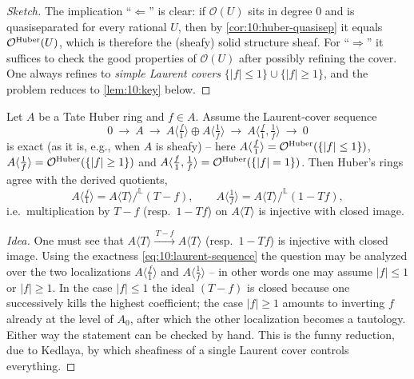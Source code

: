 \begin{proof}[Sketch]
The implication ``$\Leftarrow$'' is clear: if $\mathcal O(U)$ sits in degree $0$
and is quasiseparated for every rational $U$, then by
\cref{cor:10:huber-quasisep} it equals $\mathcal{O}^{\mathrm{Huber}}(U)$, which is therefore the (sheafy)
solid structure sheaf. For ``$\Rightarrow$'' it suffices to check the good
properties of $\mathcal O(U)$ after possibly refining the cover. One always
refines to \emph{simple Laurent covers} $\{|f|\le1\}\cup\{|f|\ge1\}$, and the
problem reduces to \cref{lem:10:key} below.
\end{proof}

\begin{lemma}
\label{lem:10:key}
Let $A$ be a Tate Huber ring and $f\in A$. Assume the Laurent-cover sequence
\begin{equation}
\label{eq:10:laurent-sequence}
0\ \to\ A\ \to\ A\langle \tfrac f1\rangle\oplus A\langle\tfrac1f\rangle\ \to\
A\langle \tfrac f1,\tfrac1f\rangle\ \to\ 0
\end{equation}
is exact (as it is, e.g., when $A$ is sheafy) -- here
$A\langle\tfrac f1\rangle=\mathcal{O}^{\mathrm{Huber}}(\{|f|\le1\})$,
$A\langle\tfrac1f\rangle=\mathcal{O}^{\mathrm{Huber}}(\{|f|\ge1\})$ and
$A\langle\tfrac f1,\tfrac1f\rangle=\mathcal{O}^{\mathrm{Huber}}(\{|f|=1\})$. Then Huber's rings agree
with the derived quotients,
\begin{equation*}
A\langle \tfrac f1\rangle=A\langle T\rangle/^{\mathbb{L}}(T-f),\qquad
A\langle \tfrac1f\rangle=A\langle T\rangle/^{\mathbb{L}}(1-Tf),
\end{equation*}
i.e.\ multiplication by $T-f$ (resp.\ $1-Tf$) on $A\langle T\rangle$ is injective
with closed image.
\end{lemma}

\begin{proof}[Idea]
One must see that $A\langle T\rangle\xrightarrow{\,T-f\,}A\langle T\rangle$ (resp.\
$1-Tf$) is injective with closed image. Using the exactness
\eqref{eq:10:laurent-sequence} the question may be analyzed over the two
localizations $A\langle\tfrac f1\rangle$ and $A\langle\tfrac1f\rangle$ -- in
other words one may assume $|f|\le1$ or $|f|\ge1$. In the case $|f|\le1$ the ideal
$(T-f)$ is closed because one successively kills the highest coefficient; the case
$|f|\ge1$ amounts to inverting $f$ already at the level of $A_{0}$, after which the
other localization becomes a tautology. Either way the statement can be checked by
hand. This is the funny reduction, due to Kedlaya, by which sheafiness of a single
Laurent cover controls everything.
\end{proof}

